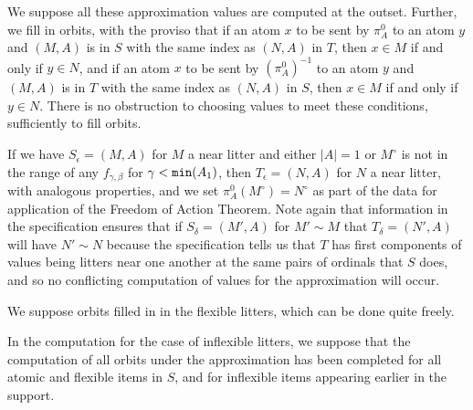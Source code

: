 \documentclass[112pt]{article}
\begin{document}
\begin{description}
We suppose all these approximation values are computed at the outset.  Further, we fill in orbits,
with the proviso that if an atom $x$  to be sent by $\pi^0_A$ to an atom $y$ and $(M,A)$ is in $S$ with the same index as $(N,A)$ in $T$, then $x \in M$ if and only if $y \in N$,   and if an atom $x$  to be sent by $(\pi^0_A)^{-1}$ to an atom $y$ and $(M,A)$ is in $T$ with the same index as $(N,A)$ in $S$, then $x \in M$ if and only if $y \in N$.  There is no obstruction to choosing values to meet these conditions, sufficiently to fill orbits.

If we have $S_\epsilon = (M,A)$ for $M$ a near litter and either $|A|=1$ or $M^\circ$ is not in the range of any $f_{\gamma,\beta}$ for $\gamma<{\tt min}(A_1)$, then $T_\epsilon = (N,A)$ for $N$ a near litter, with analogous properties, and we set $\pi^0_A(M^\circ) = N^\circ$  as part of the data for application of the Freedom of Action Theorem.    Note again
that information in the specification ensures that if $S_\delta = (M',A)$  for $M'\sim M$ that
$T_\delta = (N',A)$ will have $N' \sim N$ because the specification tells us that $T$ has first components of values being litters near one another at the same pairs of ordinals that $S$ does,
and so no conflicting computation of values for the approximation will occur.

We suppose orbits filled in in the flexible litters, which can be done quite freely.

In the computation for the case of inflexible litters, we suppose that the computation of all orbits under the approximation has been completed for all atomic and flexible items in $S$, and for inflexible items appearing earlier in the support.


\end{description}
\end{document}
